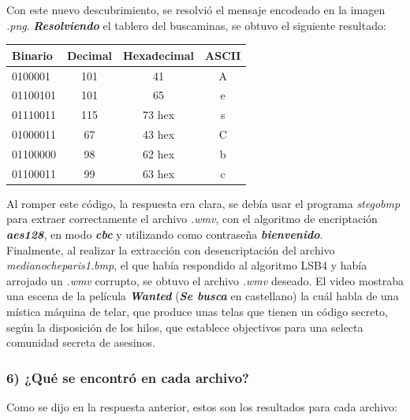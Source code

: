 \documentclass[a4paper,10pt]{article}
\begin{document}
Con este nuevo descubrimiento, se resolvió el mensaje encodeado en la imagen \textit{.png}. \textit{\textbf{Resolviendo}} el tablero del buscaminas, se obtuvo el siguiente resultado:
\begin{center}
\begin{tabular}{|l|c|c|c|}
    \hline
    Binario       & Decimal       & Hexadecimal   & ASCII \\
    \hline
    0100001       & 101           & 41            & A     \\
    \hline
    01100101      & 101           & 65            & e     \\
    \hline
    01110011      & 115           & 73 hex        & s     \\
    \hline
    01000011      & 67            & 43 hex        & C     \\
    \hline
    01100000      & 98            & 62 hex        & b     \\
    \hline
    01100011      & 99            & 63 hex        & c     \\
    \hline
\end{tabular}
\end{center}

Al romper este código, la respuesta era clara, se debía usar el programa \textit{stegobmp} para extraer correctamente el archivo \textit{.wmv}, con el algoritmo de encriptación
\textit{\textbf{aes128}}, en modo \textit{\textbf{cbc}} y utilizando como contraseña \textit{\textbf{bienvenido}}.\\

Finalmente, al realizar la extracción con desencriptación del archivo \textit{medianocheparis1.bmp}, el que había respondido al algoritmo LSB4 y había arrojado un 
\textit{.wmv} corrupto, se obtuvo el archivo \textit{.wmv} deseado. El video mostraba una escena de la película \textit{\textbf{Wanted}} (\textit{\textbf{Se busca}} en castellano)
la cuál habla de una mística máquina de telar, que produce unas telas que tienen un código secreto, según la disposición de los hilos, que establece objectivos para una selecta
comunidad secreta de asesinos.

\subsubsection*{ 6) ¿Qué se encontró en cada archivo?}

Como se dijo en la respuesta anterior, estos son los resultados para cada archivo:
\end{document}
